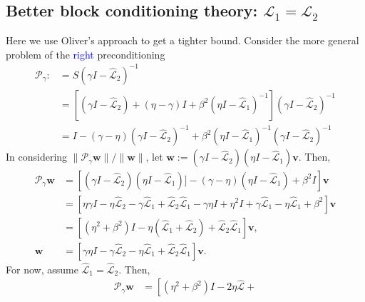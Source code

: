 \documentclass[a4paper,10pt]{article}
\newcommand{\tcb}{\textcolor{blue}}
\begin{document}
{%
\subsection{Better block conditioning theory: $\mathcal{L}_1 = \mathcal{L}_2$}

Here we use Oliver's approach to get a tighter bound.
Consider the more general problem of the \tcb{right} preconditioning 
%
\begin{align}\nonumber
\mathcal{P}_\gamma :&=
S(\gamma I- \widehat{\mathcal{L}}_2)^{-1} \\
& = \left[ (\gamma I - \widehat{\mathcal{L}}_2) + (\eta-\gamma)I +
	\beta^2 (\eta I - \widehat{\mathcal{L}}_1)^{-1}\right]
	(\gamma I - \widehat{\mathcal{L}}_2)^{-1} \\
& = I - (\gamma - \eta)( \gamma I- \widehat{\mathcal{L}}_2)^{-1} + 
	\beta^2( \eta I-\widehat{\mathcal{L}}_1)^{-1}
	( \gamma I- \widehat{\mathcal{L}}_2)^{-1}\nonumber
\end{align}
%
In considering $\|\mathcal{P}_\gamma\mathbf{w}\|/\|\mathbf{w}\|$, let $\mathbf{w}:= 
(\gamma I- \widehat{\mathcal{L}}_2)(\eta I-\widehat{\mathcal{L}}_1)\mathbf{v}$.
Then,
%
\begin{align*}
\mathcal{P}_\gamma\mathbf{w} & = \left[
	(\gamma I- \widehat{\mathcal{L}}_2)(\eta I-\widehat{\mathcal{L}}_1) ]
	 - (\gamma - \eta)(\eta I-\widehat{\mathcal{L}}_1) + \beta^2 I\right]\mathbf{v} \\
& = \left[\eta\gamma I - \eta\widehat{\mathcal{L}}_2 - \gamma \widehat{\mathcal{L}}_1
	+ \widehat{\mathcal{L}}_2\widehat{\mathcal{L}}_1 - \gamma\eta I + \eta^2 I
	+ \gamma \widehat{\mathcal{L}}_1 - \eta \widehat{\mathcal{L}}_1 + \beta^2\right]\mathbf{v} \\
& = \left[ (\eta^2+\beta^2) I - \eta (\widehat{\mathcal{L}}_1 + \widehat{\mathcal{L}}_2) +
	\widehat{\mathcal{L}}_2\widehat{\mathcal{L}}_1 \right]\mathbf{v}, \\
\mathbf{w} & = \left[ \gamma\eta I - \gamma\widehat{\mathcal{L}}_2 -
	\eta \widehat{\mathcal{L}}_1 +
	\widehat{\mathcal{L}}_2\widehat{\mathcal{L}}_1 \right]\mathbf{v}.
\end{align*}
%
For now, assume $ \widehat{\mathcal{L}}_1 = \widehat{\mathcal{L}}_2$. Then,
%
\begin{align*}
\mathcal{P}_\gamma\mathbf{w} & = \left[ (\eta^2+\beta^2) I - 2\eta \widehat{\mathcal{L}} +

\end{align*}}
\end{document}
